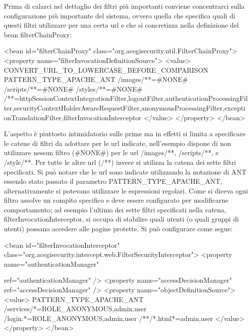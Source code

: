 Prima di calarci nel dettaglio dei filtri più importanti conviene concentrarci sulla configurazione più importante del sistema, ovvero quella che specifica quali di questi filtri utilizzare per una certa url e che si concretizza nella definizione del bean filterChainProxy:  


\begin{xml}
<bean id="filterChainProxy"
     class="org.acegisecurity.util.FilterChainProxy">
  <property name="filterInvocationDefinitionSource">
     <value>
    CONVERT_URL_TO_LOWERCASE_BEFORE_COMPARISON
    PATTERN_TYPE_APACHE_ANT 
    /images/**=#NONE#
    /scripts/**=#NONE# 
    /styles/**=#NONE#
    /**=httpSessionContextIntegrationFilter,logoutFilter,authenticationProcessingFilter,securityContextHolderAwareRequestFilter,anonymousProcessingFilter,exceptionTranslationFilter,filterInvocationInterceptor
    </value>
  </property>
</bean>
\end{xml}

L'aspetto è piuttosto intimidatorio sulle prime ma in effetti si limita a specificare le catene di filtri da adottare per le url indicate, nell'esempio dispone di non utilizzare nessun filtro (\#NONE\#) per le url /images/**, /scripts/**, e /style/**. Per tutte le altre url (/**) invece si utilizza la catena dei sette filtri specificati. Si può notare che le url sono indicate utilizzando la notazione di ANT essendo stato passato il parametro   PATTERN\_TYPE\_APACHE\_ANT, alternativamente si potevano utilizzare le espressioni regolari. 
Come si diceva ogni filtro assolve un compito specifico e deve essere configurato per modificarne comportamento; ad esempio l'ultimo dei sette filtri specificati nella catena,  filterInvocationInterceptor, si occupa di stabilire quali utenti (o quali gruppi di utenti) possano accedere alle pagine protette. Si può configurare come segue:

\begin{xml}
<bean id="filterInvocationInterceptor"
  class="org.acegisecurity.intercept.web.FilterSecurityInterceptor">
  <property name="authenticationManager"
 
                  ref="authenticationManager" />
  <property name="accessDecisionManager"
        ref="accessDecisionManager" />
  <property name="objectDefinitionSource">
    <value>
    PATTERN_TYPE_APACHE_ANT
    /services/*=ROLE_ANONYMOUS,admin,user
    /login.*=ROLE_ANONYMOUS,admin,user
    /**/*.html*=admin,user
    </value>
  </property>
</bean>
\end{xml}

